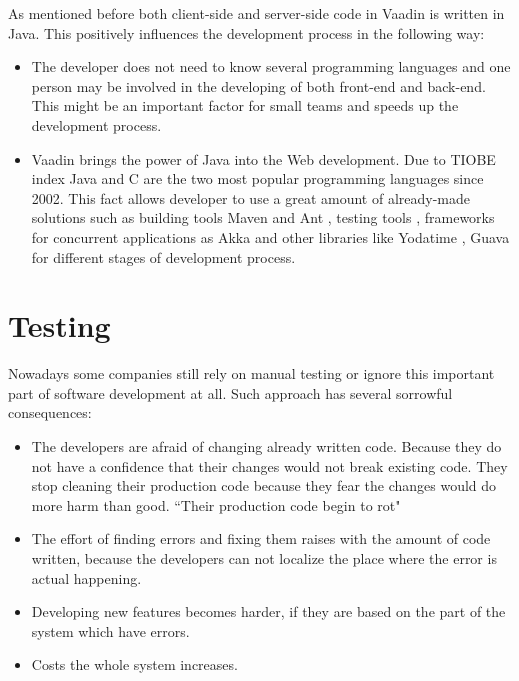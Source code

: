    As mentioned before both client-side and server-side code in Vaadin is written
   in Java. This positively influences the development process in the following
   way:
   \begin{itemize}
     \item The developer does not need to know several programming languages and one
    person may be involved in the developing of both front-end and back-end. This
    might be an important factor for small teams and speeds up the development
    process.
   \item Vaadin brings the power of Java into the Web development. Due to
    TIOBE index \cite{tiobeIndex} Java and C are the two most popular programming
    languages since 2002. This fact allows developer to use a great amount of
    already-made solutions such as building tools Maven \cite{maven} and Ant
    \cite{ant}, testing tools \cite{junit}, frameworks for concurrent
    applications as Akka \cite{akka} and other libraries like Yodatime \cite{yodatime}, Guava \cite{guava} for different stages of development
    process.
  \end{itemize}  		
		
\section{Testing}
		Nowadays some companies still rely on manual testing or ignore this
		important part of software development at all. Such approach has several
		sorrowful consequences:
		\begin{itemize}
			\item The developers are afraid of changing already written
			code. Because they do not have a confidence that their changes would not 
			break existing code. They stop cleaning their production code because they
			fear the changes would do more harm than good. ``Their production code begin
			to rot"
			\cite[p.123]{cleancode} 
			
			\item The effort of finding errors and	fixing them raises with the amount of
			code written, because the developers can not localize the place where the
			error is actual happening.
			\item Developing new features becomes harder, if they are based on the part
			of the system which have errors.
		
			\item Costs the whole system increases.
	 	 \end{itemize}
	 	 
